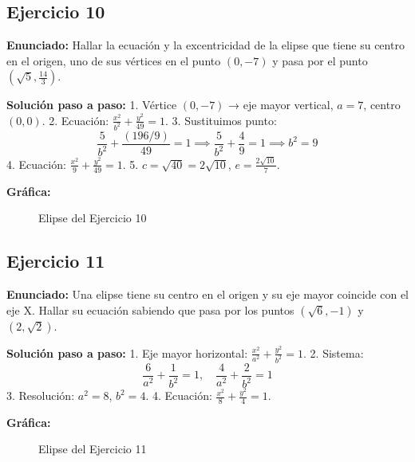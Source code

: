 \documentclass[12pt,a4paper]{article}
\begin{document}
\subsection{Ejercicio 10}
\textbf{Enunciado:} Hallar la ecuación y la excentricidad de la elipse que tiene su centro en el origen, uno de sus vértices en el punto \((0, -7)\) y pasa por el punto \(\left(\sqrt{5}, \frac{14}{3}\right)\).

\textbf{Solución paso a paso:}
1. Vértice \((0,-7)\) → eje mayor vertical, \(a=7\), centro \((0,0)\).
2. Ecuación: \(\frac{x^2}{b^2} + \frac{y^2}{49} = 1\).
3. Sustituimos punto:
   \[
   \frac{5}{b^2} + \frac{(196/9)}{49} = 1 \implies \frac{5}{b^2} + \frac{4}{9} = 1 \implies b^2 = 9
   \]
4. Ecuación: \(\frac{x^2}{9} + \frac{y^2}{49} = 1\).
5. \(c = \sqrt{40} = 2\sqrt{10}\), \(e = \frac{2\sqrt{10}}{7}\).

\textbf{Gráfica:}
\begin{figure}[H]
\centering
{}
\caption{Elipse del Ejercicio 10}
\end{figure}
\newpage

\subsection{Ejercicio 11}
\textbf{Enunciado:} Una elipse tiene su centro en el origen y su eje mayor coincide con el eje X. Hallar su ecuación sabiendo que pasa por los puntos \((\sqrt{6}, -1)\) y \((2, \sqrt{2})\).

\textbf{Solución paso a paso:}
1. Eje mayor horizontal: \(\frac{x^2}{a^2} + \frac{y^2}{b^2} = 1\).
2. Sistema:
   \[
   \frac{6}{a^2} + \frac{1}{b^2} = 1, \quad \frac{4}{a^2} + \frac{2}{b^2} = 1
   \]
3. Resolución: \(a^2 = 8\), \(b^2 = 4\).
4. Ecuación: \(\frac{x^2}{8} + \frac{y^2}{4} = 1\).

\textbf{Gráfica:}
\begin{figure}[H]
\centering
{}
\caption{Elipse del Ejercicio 11}
\end{figure}
\newpage
\end{document}
